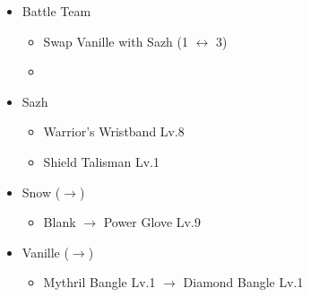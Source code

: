 \begin{menu}
\begin{itemize}
\begin{itemize}
		\end{itemize}
		\paradigm
		\begin{itemize}
			\item Battle Team
				\begin{itemize}
					\item Swap Vanille with Sazh (1 $\leftrightarrow$ 3)
					\item {}%
				  {\paradigmline{\com}{(\com)}{\med}}%
			      {\paradigmline[4]{\com}{(\com)}{(\com)}}%
			      {\paradigmline{\syn}{\sen}{(\sab)}}%
			      {\paradigmline{[\syn]}{(\rav)}{(\med)}}%
			      {\paradigmline{\rav}{(\rav)}{[\med]}}%
			      {\paradigmline{\rav}{[\rav]}{\rav}}%
				\end{itemize}
		\end{itemize}
		\equip
		\begin{itemize}
			\item Sazh
				\begin{itemize}
					\item Warrior's Wristband Lv.8
					\item Shield Talisman Lv.1
				\end{itemize}
			\item Snow ($\rightarrow$)
				\begin{itemize}
					\item Blank $\rightarrow$ Power Glove Lv.9
				\end{itemize}
			\item Vanille ($\rightarrow$)
				\begin{itemize}
					\item Mythril Bangle Lv.1 $\rightarrow$ Diamond Bangle Lv.1
				\end{itemize}
		\end{itemize}
	\end{itemize}
\end{menu}

\renewcommand{\first}{[1] Tireless Charge (\com/\com/\med)}
\renewcommand{\second}{[2] Cerberus (\com/\com/\com)}
\renewcommand{\third}{[3] Premeditation (\syn/\sen/\sab)}
\renewcommand{\fourth}{[4] Coordination (\syn/\rav/\med)}
\renewcommand{\fifth}{[5] Thaumaturgy (\rav/\rav/\med)}
\renewcommand{\sixth}{[6] Tri-Disaster (\rav/\rav/\rav)}

